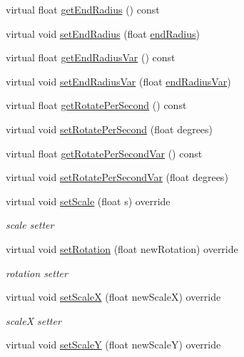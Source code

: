 \begin{DoxyCompactItemize}
\item 
virtual float \hyperlink{classParticleSystem_acae8ff3e7f22dd3e95dd91ca557e84e4}{get\+End\+Radius} () const
\item 
virtual void \hyperlink{classParticleSystem_ad240a482288ba1272efd245d9fb8122a}{set\+End\+Radius} (float \hyperlink{classParticleSystem_a26521c52751fab3520bfd1edbddb581f}{end\+Radius})
\item 
virtual float \hyperlink{classParticleSystem_a0912740bed7df2a34b0669a337d187c6}{get\+End\+Radius\+Var} () const
\item 
virtual void \hyperlink{classParticleSystem_acc0b6eccf9a7847260a57b4c0cc5a91e}{set\+End\+Radius\+Var} (float \hyperlink{classParticleSystem_a9a50b646561863981982c5e850ee1c8b}{end\+Radius\+Var})
\item 
virtual float \hyperlink{classParticleSystem_aa3124fe0f4fe73573246aae7be9bac63}{get\+Rotate\+Per\+Second} () const
\item 
virtual void \hyperlink{classParticleSystem_aaca0a95f3742395cb1826d1f6896432d}{set\+Rotate\+Per\+Second} (float degrees)
\item 
virtual float \hyperlink{classParticleSystem_a3ec2c6f802859e72bca1dde25f1d81cb}{get\+Rotate\+Per\+Second\+Var} () const
\item 
virtual void \hyperlink{classParticleSystem_a8e9f392f03d1769c4804c258c499b53b}{set\+Rotate\+Per\+Second\+Var} (float degrees)
\item 
virtual void \hyperlink{classParticleSystem_ad53bd7f8621c6ea670a5c63866d7b682}{set\+Scale} (float s) override
\begin{DoxyCompactList}\small\item\em scale setter \end{DoxyCompactList}\item 
virtual void \hyperlink{classParticleSystem_ad3fffe8df2aafe8a5bbf9402b0dbe4a3}{set\+Rotation} (float new\+Rotation) override
\begin{DoxyCompactList}\small\item\em rotation setter \end{DoxyCompactList}\item 
virtual void \hyperlink{classParticleSystem_aa1634f3d3f3d13ad5d3c14f901be0bc0}{set\+ScaleX} (float new\+ScaleX) override
\begin{DoxyCompactList}\small\item\em scaleX setter \end{DoxyCompactList}\item 
virtual void \hyperlink{classParticleSystem_a3b3ba015dde4abcf804692cacef4f575}{set\+ScaleY} (float new\+ScaleY) override

\end{DoxyCompactItemize}
